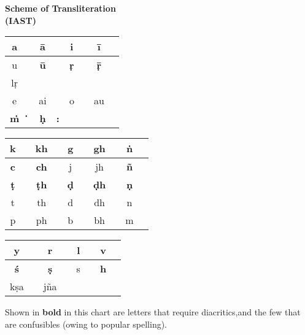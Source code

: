 \thispagestyle{empty}
\begin{center}
{\LARGE\bfseries Scheme of Transliteration\\[8pt] (IAST)}\label{transliteration}
\vskip 26pt

\bgroup
\fontsize{11}{14pt}\selectfont
\renewcommand{\arraystretch}{1.45}
\begin{tabular}{|c|c!{\vrule width 0.8pt}c|c!{\vrule width 0.8pt}c|c!{\vrule width 0.8pt}c|c|}
\hline
a &  & {\bf ā} &  & i &  & {\bf ī} & \\
\hline
u &      & {\bf ū} &  & {\bf ṛ} &  & {\bf ṝ} &  \\
\hline
lṛ &    &     &                       &     &                       &      & \\
\hline
e &  & ai &  & o &  & au & \\
\hline
{\bf ṁ} &  {\bf‍\.{\phantom{i}}}  & {\bf ḥ}  & {\bf :}         &   &            &   & \\  	
\hline
\end{tabular}
\vskip 18pt

\begin{tabular}{|c|c!{\vrule width 0.8pt}c|c!{\vrule width 0.8pt}c|c!{\vrule width 0.8pt}c|c!{\vrule width 0.8pt}c|c|}
\hline
k &  & kh &  & g &  & gh &  & {\bf ṅ} & \\
\hline
{\bf c} &  & {\bf ch} &  & j &  & jh &   & {\bf ñ} &  \\
\hline
{\bf ṭ} &  & {\bf ṭh} &  & {\bf ḍ} &   & {\bf ḍh} &  & {\bf ṇ} &   \\
\hline
t &   & th &   & d &  & dh &   & n &  \\
\hline
p &  & ph &  & b &  & bh &   & m &  \\ 
\hline
\end{tabular}
\vskip 18pt

\begin{tabular}{|c|c!{\vrule width 0.8pt}c|c!{\vrule width 0.8pt}c|c!{\vrule width 0.8pt}c|c|}
\hline
y &      & r   &  & l &  & v &  \\
\hline
{\bf ś} &    & {\bf ṣ}   &  & s &  & {\bf h} &  \\
\hline
kṣa &  & jña &  &    &    &   &  \\
\hline
\end{tabular}
\egroup
\end{center}

Shown in \textbf{bold} in this chart are letters that require diacritics,\break and the few that are confusibles (owing to popular spelling).
